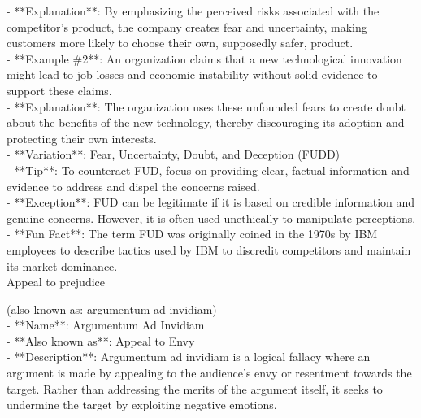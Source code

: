 \documentclass[a4paper,12pt,single,pdftex]{scrbook}
\begin{document}
    
      - **Explanation**: By emphasizing the perceived risks associated with the competitor’s product, the company creates fear and uncertainty, making customers more likely to choose their own, supposedly safer, product.
    \\

    
      - **Example \#2**: An organization claims that a new technological innovation might lead to job losses and economic instability without solid evidence to support these claims.
    \\

    
      - **Explanation**: The organization uses these unfounded fears to create doubt about the benefits of the new technology, thereby discouraging its adoption and protecting their own interests.
    \\

    
      - **Variation**: Fear, Uncertainty, Doubt, and Deception (FUDD)
    \\

    
      - **Tip**: To counteract FUD, focus on providing clear, factual information and evidence to address and dispel the concerns raised.
    \\

    
      - **Exception**: FUD can be legitimate if it is based on credible information and genuine concerns. However, it is often used unethically to manipulate perceptions.
    \\

    
      - **Fun Fact**: The term FUD was originally coined in the 1970s by IBM employees to describe tactics used by IBM to discredit competitors and maintain its market dominance.
    \\

  

Appeal to prejudice
    
      (also known as: argumentum ad invidiam)
    \\

  
    
      - **Name**: Argumentum Ad Invidiam
    \\

    
      - **Also known as**: Appeal to Envy
    \\

    
      - **Description**: Argumentum ad invidiam is a logical fallacy where an argument is made by appealing to the audience's envy or resentment towards the target. Rather than addressing the merits of the argument itself, it seeks to undermine the target by exploiting negative emotions.
    \\
\end{document}
